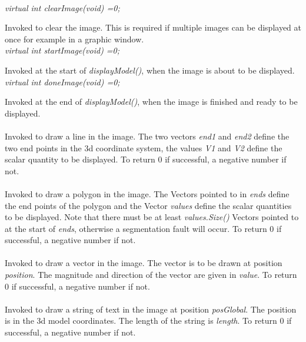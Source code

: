  \\
{\em virtual int clearImage(void) =0;}

Invoked to clear the image. This is required if multiple images can be
displayed at once for example in a graphic window. \\

{\em virtual int startImage(void) =0;}

Invoked at the start of {\em displayModel()}, when the image is about
to be displayed. \\

{\em virtual int doneImage(void) =0;}

Invoked at the end of {\em displayModel()}, when the image is finished
and ready to be displayed. \\

\\
Invoked to draw a line in the image. The two vectors {\em end1} and
{\em end2} define the two end points in the 3d coordinate system, the
values {\em V1} and {\em V2} define the scalar quantity to be
displayed. To return $0$ if successful, a negative number if not.\\



 \\ 
Invoked to draw a polygon in the image. The Vectors pointed to in {\em
ends} define the end points of the polygon and the Vector {\em values}
define the scalar quantities to be displayed. Note that there must
be at least {\em values.Size()} Vectors pointed to at the start of
{\em ends}, otherwise a segmentation fault will occur. To return $0$
if successful, a negative number if not.\\

\\
Invoked to draw a vector in the image. The vector is to be drawn
at position {\em position}. The magnitude and direction of the vector
are given in {\em value}. To return $0$ if successful, a negative
number if not.\\ 


\\
Invoked to draw a string of text in the image at position {\em
posGlobal}. The position is in the 3d model coordinates. The length of
the string is {\em length}. To return $0$ if successful, a negative
number if not.\\ 


